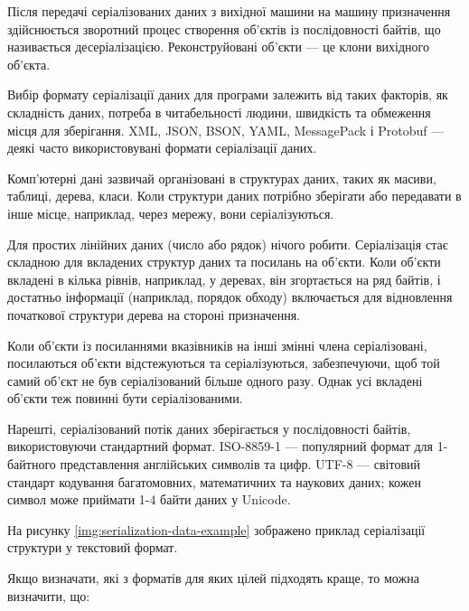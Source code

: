 \documentclass{lib/styles/default-style}
\begin{document}
    Після передачі серіалізованих даних з вихідної машини на машину призначення
    здійснюється зворотний процес створення об'єктів із послідовності байтів, що називається десеріалізацією.
    Реконструйовані об'єкти --- це клони вихідного об'єкта.

    Вибір формату серіалізації даних для програми залежить
    від таких факторів, як складність даних, потреба в читабельності людини, швидкість
    та обмеження місця для зберігання. XML, JSON, BSON, YAML, MessagePack і Protobuf --- деякі
    часто використовувані формати серіалізації даних.


    Комп'ютерні дані зазвичай організовані в структурах даних, таких як масиви,
    таблиці, дерева, класи. Коли структури даних потрібно зберігати або передавати
    в інше місце, наприклад, через мережу, вони серіалізуються.

    Для простих лінійних даних (число або рядок) нічого робити.
    Серіалізація стає складною для вкладених структур даних та посилань на об'єкти.
    Коли об'єкти вкладені в кілька рівнів, наприклад, у деревах, він згортається на ряд
    байтів, і достатньо інформації (наприклад, порядок обходу) включається для відновлення
    початкової структури дерева на стороні призначення.

    Коли об'єкти із посиланнями вказівників
    на інші змінні члена серіалізовані, посилаються об'єкти відстежуються та
    серіалізуються, забезпечуючи, щоб той самий об’єкт не був серіалізований більше одного разу.
    Однак усі вкладені об'єкти теж повинні бути серіалізованими.

    Нарешті, серіалізований потік даних зберігається у послідовності байтів,
    використовуючи стандартний формат.
    ISO-8859-1 --- популярний формат для 1-байтного представлення англійських символів та цифр.
    UTF-8 --- світовий стандарт кодування багатомовних, математичних та наукових даних; кожен символ може приймати 1-4 байти даних у Unicode.

    На рисунку \ref{img:serialization-data-example} зображено приклад серіалізації структури у текстовий формат.

    
    Якщо визначати, які з форматів для яких цілей підходять краще, то можна визначити, що:
\end{document}
